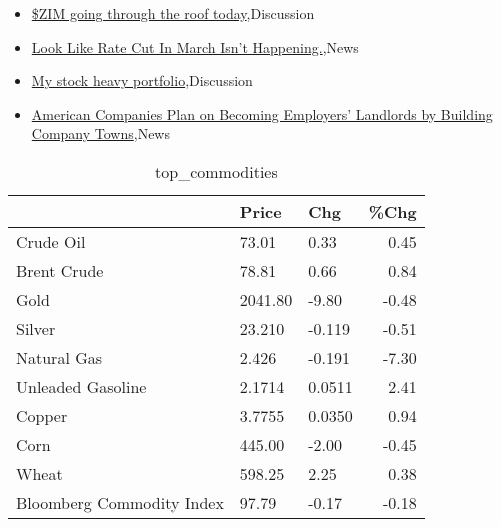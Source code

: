 \documentclass{article}%
\begin{document}
%
\begin{itemize}%
\item%
\href{https://reddit.com/r/wallstreetbets/comments/197zg9d/zim\_going\_through\_the\_roof\_today/}{\$ZIM going through the roof today},Discussion%
\item%
\href{https://reddit.com/r/wallstreetbets/comments/197xlod/look\_like\_rate\_cut\_in\_march\_isnt\_happening/}{Look Like Rate Cut In March Isn't Happening.},News%
\item%
\href{https://reddit.com/r/StockMarket/comments/197rhuw/my\_stock\_heavy\_portfolio/}{My stock heavy portfolio},Discussion%
\item%
\href{https://reddit.com/r/Economics/comments/197yr90/american\_companies\_plan\_on\_becoming\_employers/}{American Companies Plan on Becoming Employers' Landlords by Building Company Towns},News%
\end{itemize}%


\begin{table}[htbp]%
\caption{top\_commodities}%
\centering%
\begin{adjustbox}{width=1\textwidth}%
\begin{tabular}{lllr}
\toprule
                          &   Price &    Chg &  \%Chg \\
\midrule
               Crude Oil  &   73.01 &   0.33 &  0.45 \\
             Brent Crude  &   78.81 &   0.66 &  0.84 \\
                    Gold  & 2041.80 &  -9.80 & -0.48 \\
                  Silver  &  23.210 & -0.119 & -0.51 \\
             Natural Gas  &   2.426 & -0.191 & -7.30 \\
       Unleaded Gasoline  &  2.1714 & 0.0511 &  2.41 \\
                  Copper  &  3.7755 & 0.0350 &  0.94 \\
                    Corn  &  445.00 &  -2.00 & -0.45 \\
                   Wheat  &  598.25 &   2.25 &  0.38 \\
Bloomberg Commodity Index &   97.79 &  -0.17 & -0.18 \\
\bottomrule
\end{tabular}
%
\end{adjustbox}%
\end{table}

%
\end{document}
